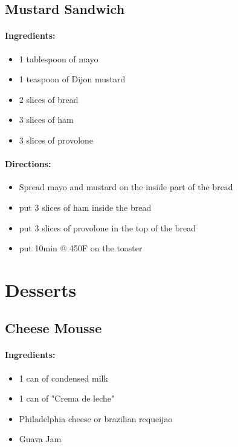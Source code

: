 \documentclass{article}
\begin{document}
\subsection{Mustard Sandwich}

\paragraph{Ingredients:}
\begin{itemize}
    \item 1 tablespoon of mayo
    \item 1 teaspoon of Dijon mustard
    \item 2 slices of bread
    \item 3 slices of ham
    \item 3 slices of provolone
\end{itemize}

\paragraph{Directions:}
\begin{itemize}
    \item Spread mayo and mustard on the inside part of the bread
    \item put 3 slices of ham inside the bread
    \item put 3 slices of provolone in the top of the bread
    \item put 10min @ 450F on the toaster
\end{itemize}

\section{Desserts}


\subsection{Cheese Mousse}

\paragraph{Ingredients:}
\begin{itemize}
    \item 1 can of condensed milk
    \item 1 can of "Crema de leche"
    \item Philadelphia cheese or brazilian requeijao
    \item Guava Jam
\end{itemize}
\end{document}
